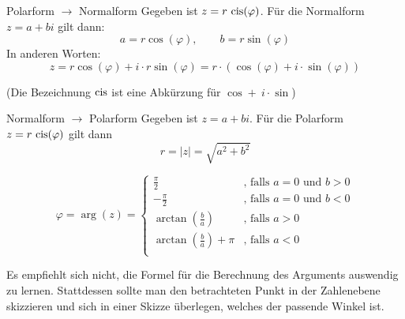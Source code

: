\begin{satz}
    {Polarform $\rightarrow$ Normalform}{}
    Gegeben ist $z = r\ \cis(\varphi)$. Für die Normalform $z=a+bi$ gilt dann:
    $$ a = r \cos(\varphi), \qquad b = r\sin(\varphi)$$
    In anderen Worten:
    $$z  = r\cos(\varphi) + i \cdot r\sin(\varphi) =r \cdot \left( \cos(\varphi) + i \cdot \sin(\varphi)\right)$$

   (Die Bezeichnung $\mathrm{cis}$ ist eine Abkürzung für $\cos +\  i  \cdot \sin$)
\end{satz}

\begin{satz}
    {Normalform $\rightarrow$ Polarform}{}
    Gegeben ist $z = a + bi$. Für die Polarform $z = r\ \cis(\varphi)$ gilt dann
    $$r = |z| = \sqrt{a^2+b^2}$$

    $$\varphi = \arg (z) = \left\{ \begin{array}{ll}
            \frac{\pi}{2} & \text{, falls } a=0 \text{ und } b > 0 \\
            -\frac{\pi}{2} & \text{, falls } a=0 \text{ und } b < 0 \\
            \arctan\left(\frac{b}{a}\right) & \text{, falls $a>0$} \\
            \arctan\left(\frac{b}{a}\right) + \pi & \text{, falls $a<0$ } \\
    \end{array}\right.$$
    
\end{satz}

Es empfiehlt sich nicht, die Formel für die Berechnung des Arguments auswendig zu lernen. Stattdessen sollte man den betrachteten Punkt in der Zahlenebene skizzieren und sich in einer Skizze überlegen, welches der passende Winkel ist.



